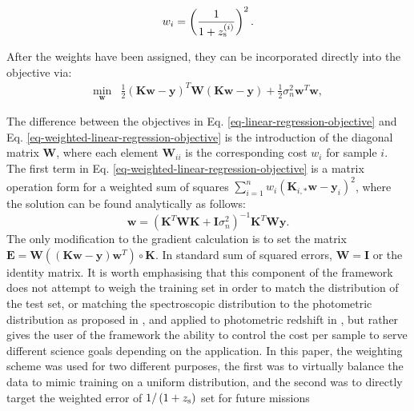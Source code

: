 \documentclass[useAMS,usenatbib,fleqn]{mn2e}
\begin{document}
\begin{equation}
\label{eq-normalized-weights}
w_{i} = \left(\frac{1}{1+z_{\rm s}^{\left(i\right)}}\right)^{2}.
\end{equation}

After the weights have been assigned, they can be incorporated directly into the objective via:
\begin{equation}
\label{eq-weighted-linear-regression-objective}
\begin{array}{lcl}
\underset{\mathbf{w}}{\text{min}} &\frac{1}{2}\left ( \mathbf{K}\mathbf{w}-\mathbf{y} \right )^{T} \mathbf{W}\left( \mathbf{K}\mathbf{w}-\mathbf{y} \right )+\frac{1}{2}\sigma_{n}^{2}\mathbf{w}^{T}\mathbf{w},
\end{array}
\end{equation}

The difference between the objectives in Eq. \eqref{eq-linear-regression-objective} and Eq. \eqref{eq-weighted-linear-regression-objective} is the introduction of the diagonal matrix $\mathbf{W}$, where each element $\mathbf{W}_{ii}$ is the corresponding cost $w_{i}$ for sample $i$. The first term in Eq. \eqref{eq-weighted-linear-regression-objective} is a matrix operation form for a weighted sum of squares $\sum_{i=1}^{n}w_{i}\left(\mathbf{K}_{i,*}\mathbf{w}-\mathbf{y}_{i}\right)^{2}$, where the solution can be found analytically as follows:
\begin{equation}
\label{eq-weighted-linear-regression-objective-rectangular}
\mathbf{w} = \left(\mathbf{K}^{T}\mathbf{WK}+\mathbf{I}\sigma_{n}^{2} \right)^{-1}\mathbf{K}^{T}\mathbf{W}\mathbf{y}.
\end{equation}
The only modification to the gradient calculation is to set the matrix $\mathbf{E}=\mathbf{W}\left(\left(\mathbf{K}\mathbf{w}-\mathbf{y}\right)\mathbf{w}^{T}\right)\circ\mathbf{K}$. In standard sum of squared errors, $ \mathbf{W}= \mathbf{I}$ or the identity matrix. It is worth emphasising that this component of the framework does not attempt to weigh the training set in order to match the distribution of the test set, or matching the spectroscopic distribution to the photometric distribution as proposed in \citet{Lima2008}, \citet{Cunha2009} and applied to photometric redshift in \citet{sanchez14}, but rather gives the user of the framework the ability to control the cost per sample to serve different science goals depending on the application. In this paper, the weighting scheme was used for two different purposes, the first was to virtually balance the data to mimic training on a uniform distribution, and the second was to directly target the weighted error of $1/\left(1+z_{\rm s}\right)$ set for future missions
\end{document}
